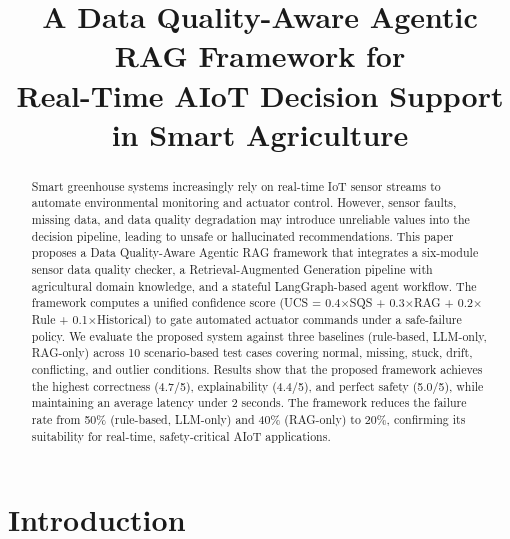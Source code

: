 \documentclass[runningheads]{llncs}
\begin{document}
\title{A Data Quality-Aware Agentic RAG Framework for\\Real-Time AIoT Decision Support in Smart Agriculture}

\maketitle

\begin{abstract}
Smart greenhouse systems increasingly rely on real-time IoT sensor streams to automate environmental monitoring and actuator control. However, sensor faults, missing data, and data quality degradation may introduce unreliable values into the decision pipeline, leading to unsafe or hallucinated recommendations. This paper proposes a Data Quality-Aware Agentic RAG framework that integrates a six-module sensor data quality checker, a Retrieval-Augmented Generation pipeline with agricultural domain knowledge, and a stateful LangGraph-based agent workflow. The framework computes a unified confidence score (UCS = 0.4$\times$SQS + 0.3$\times$RAG + 0.2$\times$Rule + 0.1$\times$Historical) to gate automated actuator commands under a safe-failure policy. We evaluate the proposed system against three baselines (rule-based, LLM-only, RAG-only) across 10 scenario-based test cases covering normal, missing, stuck, drift, conflicting, and outlier conditions. Results show that the proposed framework achieves the highest correctness (4.7/5), explainability (4.4/5), and perfect safety (5.0/5), while maintaining an average latency under 2 seconds. The framework reduces the failure rate from 50\% (rule-based, LLM-only) and 40\% (RAG-only) to 20\%, confirming its suitability for real-time, safety-critical AIoT applications.

\end{abstract}

\section{Introduction}
\end{document}
